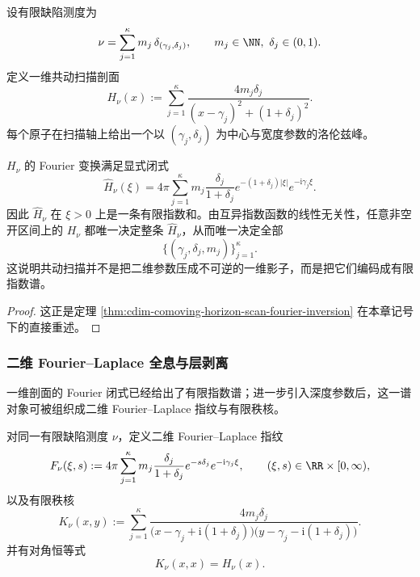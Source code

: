 \begin{definition}[有限缺陷测度与共动扫描剖面]\label{def:typed-address-biaxial-completion-comoving-profile}
设有限缺陷测度为
\[
\nu=\sum_{j=1}^{\kappa} m_j\,\delta_{(\gamma_j,\delta_j)},
\qquad
m_j\in\NN,\ \delta_j\in(0,1).
\]
定义一维共动扫描剖面
\[
H_\nu(x):=
\sum_{j=1}^{\kappa}
\frac{4m_j\delta_j}{(x-\gamma_j)^2+(1+\delta_j)^2}.
\]
每个原子在扫描轴上给出一个以 \((\gamma_j,\delta_j)\) 为中心与宽度参数的洛伦兹峰。
\end{definition}

\begin{theorem}\label{thm:typed-address-biaxial-completion-comoving-fourier-closed}
\(H_\nu\) 的 Fourier 变换满足显式闭式
\[
\widehat H_\nu(\xi)=
4\pi\sum_{j=1}^{\kappa}
m_j\frac{\delta_j}{1+\delta_j}
e^{-(1+\delta_j)|\xi|}e^{-\mathrm{i}\gamma_j\xi}.
\]
因此 \(\widehat H_\nu\) 在 \(\xi>0\) 上是一条有限指数和。由互异指数函数的线性无关性，任意非空开区间上的 \(H_\nu\) 都唯一决定整条 \(\widehat H_\nu\)，从而唯一决定全部
\[
\{(\gamma_j,\delta_j,m_j)\}_{j=1}^{\kappa}.
\]
这说明共动扫描并不是把二维参数压成不可逆的一维影子，而是把它们编码成有限指数谱。
\end{theorem}
\begin{proof}
这正是定理 \ref{thm:cdim-comoving-horizon-scan-fourier-inversion} 在本章记号下的直接重述。
\end{proof}

\subsubsection{二维 Fourier--Laplace 全息与层剥离}\label{subsubsec:typed-address-biaxial-completion-comoving-holography}
一维剖面的 Fourier 闭式已经给出了有限指数谱；进一步引入深度参数后，这一谱对象可被组织成二维 Fourier--Laplace 指纹与有限秩核。

\begin{definition}[二维边界指纹与有限秩核]\label{def:typed-address-biaxial-completion-comoving-fingerprint}
对同一有限缺陷测度 \(\nu\)，定义二维 Fourier--Laplace 指纹
\[
F_\nu(\xi,s):=
4\pi\sum_{j=1}^{\kappa}
m_j\frac{\delta_j}{1+\delta_j}
e^{-s\delta_j}e^{-\mathrm{i}\gamma_j\xi},
\qquad
(\xi,s)\in \RR\times[0,\infty),
\]
以及有限秩核
\[
K_\nu(x,y):=
\sum_{j=1}^{\kappa}
\frac{4m_j\delta_j}{
\bigl(x-\gamma_j+\mathrm{i}(1+\delta_j)\bigr)\bigl(y-\gamma_j-\mathrm{i}(1+\delta_j)\bigr)}.
\]
并有对角恒等式
\[
K_\nu(x,x)=H_\nu(x).
\]
\end{definition}

